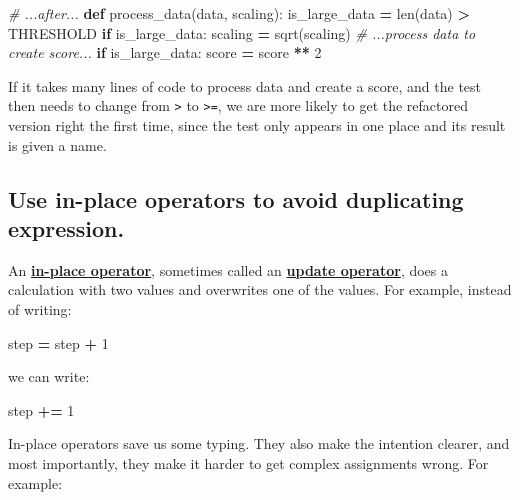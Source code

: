 \documentclass[
]{krantz}
\makeatletter
\newenvironment{Shaded}{\begin{snugshade}}{\end{snugshade}}
\newcommand{\BuiltInTok}[1]{#1}
\newcommand{\CommentTok}[1]{\textcolor[rgb]{0.56,0.35,0.01}{\textit{#1}}}
\newcommand{\ControlFlowTok}[1]{\textcolor[rgb]{0.13,0.29,0.53}{\textbf{#1}}}
\newcommand{\DecValTok}[1]{\textcolor[rgb]{0.00,0.00,0.81}{#1}}
\newcommand{\KeywordTok}[1]{\textcolor[rgb]{0.13,0.29,0.53}{\textbf{#1}}}
\newcommand{\NormalTok}[1]{#1}
\newcommand{\OperatorTok}[1]{\textcolor[rgb]{0.81,0.36,0.00}{\textbf{#1}}}
\newenvironment{kframe}{%
\medskip{}
\setlength{\fboxsep}{.8em}
 \def\at@end@of@kframe{}%
 \ifinner\ifhmode%
  \def\at@end@of@kframe{\end{minipage}}%
  \begin{minipage}{\columnwidth}%
 \fi\fi%
 \def\FrameCommand##1{\hskip\@totalleftmargin \hskip-\fboxsep
 \colorbox{shadecolor}{##1}\hskip-\fboxsep
     \hskip-\linewidth \hskip-\@totalleftmargin \hskip\columnwidth}%
 \MakeFramed {\advance\hsize-\width
   \@totalleftmargin\z@ \linewidth\hsize
   \@setminipage}}%
 {\par\unskip\endMakeFramed%
 \at@end@of@kframe}
\renewenvironment{Shaded}{\begin{kframe}}{\end{kframe}}
\newcommand{\gref}[2]{\hyperlink{#2}{\textbf{#1}}}
\makeatother
\begin{document}
\begin{Shaded}
\begin{Highlighting}[]
\CommentTok{\# ...after...}
\KeywordTok{def}\NormalTok{ process\_data(data, scaling):}
\NormalTok{    is\_large\_data }\OperatorTok{=} \BuiltInTok{len}\NormalTok{(data) }\OperatorTok{\textgreater{}}\NormalTok{ THRESHOLD}
    \ControlFlowTok{if}\NormalTok{ is\_large\_data:}
\NormalTok{        scaling }\OperatorTok{=}\NormalTok{ sqrt(scaling)}
    \CommentTok{\# ...process data to create score...}
    \ControlFlowTok{if}\NormalTok{ is\_large\_data:}
\NormalTok{        score }\OperatorTok{=}\NormalTok{ score }\OperatorTok{**} \DecValTok{2}
\end{Highlighting}
\end{Shaded}

If it takes many lines of code to process data and create a score,
and the test then needs to change from \texttt{\textgreater{}} to \texttt{\textgreater{}=},
we are more likely to get the refactored version right the first time,
since the test only appears in one place and its result is given a name.

\hypertarget{use-in-place-operators-to-avoid-duplicating-expression.}{%
\subsection{Use in-place operators to avoid duplicating expression.}\label{use-in-place-operators-to-avoid-duplicating-expression.}}

An \gref{in-place operator}{in\_place\_operator},
sometimes called an \gref{update operator}{update\_operator},
does a calculation with two values
and overwrites one of the values.
For example,
instead of writing:

\begin{Shaded}
\begin{Highlighting}[]
\NormalTok{step }\OperatorTok{=}\NormalTok{ step }\OperatorTok{+} \DecValTok{1}
\end{Highlighting}
\end{Shaded}

we can write:

\begin{Shaded}
\begin{Highlighting}[]
\NormalTok{step }\OperatorTok{+=} \DecValTok{1}
\end{Highlighting}
\end{Shaded}

In-place operators save us some typing.
They also make the intention clearer,
and most importantly,
they make it harder to get complex assignments wrong.
For example:
\end{document}
